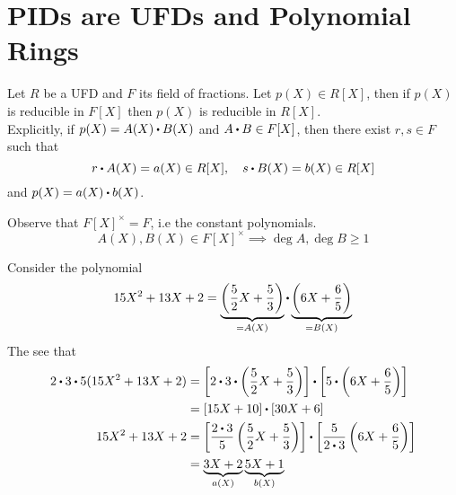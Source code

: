 \documentclass[../Main.tex]{subfiles}
\begin{document}
\chapter{PIDs are UFDs and Polynomial Rings}

\begin{lem}[title = Gauss' Lemma]
	Let $R$ be a UFD and $F$ its field of fractions. Let $p(X)\in R[X]$, then if $p(X)$ is reducible in $F[X]$ then $p(X)$ is reducible in $R[X]$.\\
	Explicitly, if $p(X)=A(X)\rdot B(X)$ and $A\rdot B\in F[X]$, then there exist $r,s\in F$ such that 
	\[r\rdot A(X) = a(X)\in R[X],\quad s\rdot B(X) = b(X) \in R[X]\]
	and $p(X) = a(X)\rdot b(X)$.
\end{lem}
Observe that $F[X]^\times = F$, i.e the constant polynomials. 
\[A(X),B(X) \in F[X]^\times \implies \deg A, \deg B \ge 1\]
\begin{example}
	Consider the polynomial
	\[15X^2+13X+2 = \underbrace{\left(\frac{5}{2}X + \frac{5}{3}\right)}_{=A(X)}\rdot  \underbrace{\left(6X + \frac{6}{5}\right)}_{=B(X)}\]
	The see that
	\begin{align*}
	2\rdot 3\rdot 5(15X^2+13X+2) &= \left[2\rdot 3 \rdot \left(\frac{5}{2}X + \frac{5}{3}\right) \right] \rdot  \left[5\rdot \left(6X + \frac{6}{5}\right)\right] \\
	&= [15X+10] \rdot{}  [30X+6]\\
	15X^2+13X+2&=\left[\frac{2\rdot 3}{5}\left(\frac{5}{2}X+\frac{5}{3}\right)\right]\rdot \left[\frac{5}{2\rdot 3}\left(6X+\frac{6}{5}\right)\right]\\
	&= \underbrace{3X+2}_{a(X)} \underbrace{5X+1}_{b(X)}
	\end{align*}
\end{example}	
\end{document}
